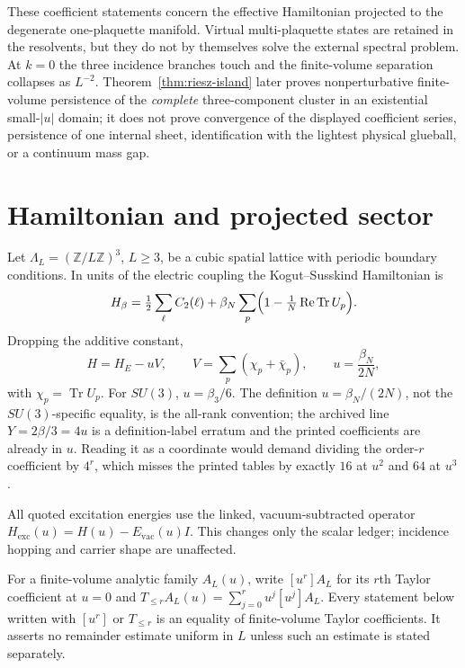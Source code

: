 \documentclass[11pt]{article}
\theoremstyle{plain}
\theoremstyle{definition}
\theoremstyle{remark}
\newcommand{\chk}[1]{}
\begin{document}
These coefficient statements concern the effective Hamiltonian projected to
the degenerate one-plaquette manifold. Virtual multi-plaquette states are
retained in the resolvents, but they do not by themselves solve the external
spectral problem. At $k=0$ the three incidence branches touch and the
finite-volume separation collapses as $L^{-2}$. Theorem~\ref{thm:riesz-island}
later proves nonperturbative finite-volume persistence of the \emph{complete}
three-component
cluster in an existential small-$|u|$ domain; it does not prove convergence of
the displayed coefficient series, persistence of one internal sheet,
identification with the lightest physical glueball, or a continuum mass gap.

\section{Hamiltonian and projected sector}

Let $\Lambda_L=(\mathbb{Z}/L\mathbb{Z})^3$, $L\ge3$, be a cubic spatial
lattice with periodic boundary conditions. In units of the electric coupling
the Kogut--Susskind Hamiltonian is
\begin{equation}
  H_\beta=\tfrac12\sum_\ell C_2(\ell)
  +\beta_N\sum_p\Bigl(1-\tfrac1N\operatorname{Re}\operatorname{Tr}U_p\Bigr).
\end{equation}
Dropping the additive constant,
\begin{equation}\label{eq:H}
  H=H_E-uV,\qquad V=\sum_p(\chi_p+\bar\chi_p),\qquad u=\frac{\beta_N}{2N},
\end{equation}
with $\chi_p=\operatorname{Tr}U_p$. For $SU(3)$, $u=\beta_3/6$. The
definition $u=\beta_N/(2N)$, not the $SU(3)$-specific equality, is the
all-rank convention; the archived line $Y=2\beta/3=4u$ is a definition-label
erratum and the printed coefficients are already in $u$. Reading it as a
coordinate would demand dividing the order-$r$ coefficient by $4^r$, which
misses the printed tables by exactly $16$ at $u^2$ and $64$ at $u^3$.
\chk{the printed towers are canonical-u: 4*Delta(3u/2) reproduces them verbatim}
\chk{the 4**r rescaling breaks the bridge: order 2 off by 16, order 3 by 64}

All quoted excitation energies use the linked, vacuum-subtracted operator
$H_{\mathrm{exc}}(u)=H(u)-E_{\mathrm{vac}}(u)I$. This changes only the scalar
ledger; incidence hopping and carrier shape are unaffected.

For a finite-volume analytic family $A_L(u)$, write $[u^r]A_L$ for its
$r$th Taylor coefficient at $u=0$ and
$T_{\le r}A_L(u)=\sum_{j=0}^r u^j[u^j]A_L$.  Every statement below written
with $[u^r]$ or $T_{\le r}$ is an equality of finite-volume Taylor
coefficients.  It asserts no remainder estimate uniform in $L$ unless such an
estimate is stated separately.
\end{document}
